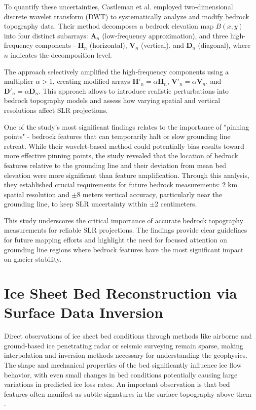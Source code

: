 To quantify these uncertainties, Castleman et al.\cite{Castleman_2022} employed two-dimensional discrete wavelet transform (DWT) to systematically analyze and modify bedrock topography data. Their method decomposes a bedrock elevation map $B(x,y)$ into four distinct subarrays: $\mathbf{A}_n$ (low-frequency approximation), and three high-frequency components - $\mathbf{H}_n$ (horizontal), $\mathbf{V}_n$ (vertical), and $\mathbf{D}_n$ (diagonal), where $n$ indicates the decomposition level. 

The approach selectively amplified the high-frequency components using a multiplier $\alpha > 1$, creating modified arrays $\mathbf{H}'_n = \alpha\mathbf{H}_n$, $\mathbf{V}'_n = \alpha\mathbf{V}_n$, and $\mathbf{D}'_n = \alpha\mathbf{D}_n$. This approach allows to introduce realistic perturbations into bedrock topography models and assess how varying spatial and vertical resolutions affect SLR projections.

One of the study's most significant findings relates to the importance of "pinning points" - bedrock features that can temporarily halt or slow grounding line retreat. While their wavelet-based method could potentially bias results toward more effective pinning points, the study revealed that the location of bedrock features relative to the grounding line and their deviation from mean bed elevation were more significant than feature amplification\cite{Castleman_2022}. Through this analysis, they established crucial requirements for future bedrock measurements: 2 km spatial resolution and $\pm$8 meters vertical accuracy, particularly near the grounding line, to keep SLR uncertainty within $\pm$2 centimeters.

This study underscores the critical importance of accurate bedrock topography measurements for reliable SLR projections. The findings provide clear guidelines for future mapping efforts and highlight the need for focused attention on grounding line regions where bedrock features have the most significant impact on glacier stability.

\section{Ice Sheet Bed Reconstruction via Surface Data Inversion}\label{Ockenden_2022}

Direct observations of ice sheet bed conditions through methods like airborne and ground-based ice penetrating radar or seismic surveying remain sparse, making interpolation and inversion methods necessary for understanding the geophysics. The shape and mechanical properties of the bed significantly influence ice flow behavior, with even small changes in bed conditions potentially causing large variations in predicted ice loss rates. An important observation is that bed features often manifest as subtle signatures in the surface topography above them \cite{Ockenden_2022}.

